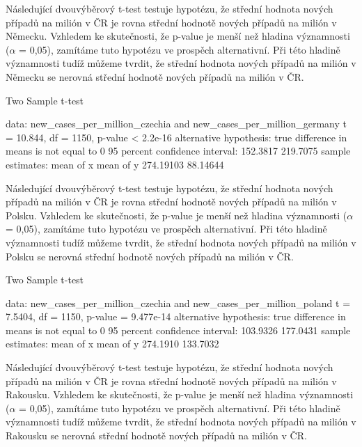 \documentclass[a4paper, 12pt]{article}
\begin{document}
\clearpage

Následující dvouvýběrový t-test testuje hypotézu, že střední hodnota nových případů na milión
v ČR je rovna střední hodnotě nových případů na milión v Německu. Vzhledem ke skutečnosti, že p-value je menší
než hladina významnosti ($\alpha$ = 0,05), zamítáme tuto hypotézu ve prospěch alternativní.
Při této hladině významnosti tudíž můžeme tvrdit, že střední hodnota nových případů na milión v Německu
se nerovná střední hodnotě nových případů na milión v ČR.

\begin{Schunk}
\begin{Soutput}
	Two Sample t-test

data:  new_cases_per_million_czechia and new_cases_per_million_germany
t = 10.844, df = 1150, p-value < 2.2e-16
alternative hypothesis: true difference in means is not equal to 0
95 percent confidence interval:
 152.3817 219.7075
sample estimates:
mean of x mean of y 
274.19103  88.14644 
\end{Soutput}
\end{Schunk}

\clearpage

Následující dvouvýběrový t-test testuje hypotézu, že střední hodnota nových případů na milión
v ČR je rovna střední hodnotě nových případů na milión v Polsku. Vzhledem ke skutečnosti, že p-value je menší
než hladina významnosti ($\alpha$ = 0,05), zamítáme tuto hypotézu ve prospěch alternativní.
Při této hladině významnosti tudíž můžeme tvrdit, že střední hodnota nových případů na milión v Polsku
se nerovná střední hodnotě nových případů na milión v ČR.

\begin{Schunk}
\begin{Soutput}
	Two Sample t-test

data:  new_cases_per_million_czechia and new_cases_per_million_poland
t = 7.5404, df = 1150, p-value = 9.477e-14
alternative hypothesis: true difference in means is not equal to 0
95 percent confidence interval:
 103.9326 177.0431
sample estimates:
mean of x mean of y 
 274.1910  133.7032 
\end{Soutput}
\end{Schunk}

Následující dvouvýběrový t-test testuje hypotézu, že střední hodnota nových případů na milión
v ČR je rovna střední hodnotě nových případů na milión v Rakousku. Vzhledem ke skutečnosti, že p-value je menší
než hladina významnosti ($\alpha$ = 0,05), zamítáme tuto hypotézu ve prospěch alternativní.
Při této hladině významnosti tudíž můžeme tvrdit, že střední hodnota nových případů na milión v Rakousku
se nerovná střední hodnotě nových případů na milión v ČR.
\end{document}
